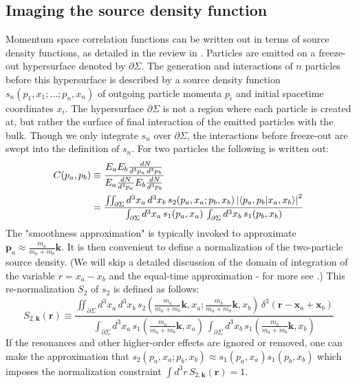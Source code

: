 \subsection{Imaging the source density function}
Momentum space correlation functions can be written out in terms of source density functions, as detailed in the review in \cite{Lisa:2005dd}.
Particles are emitted on a freeze-out hypersurface denoted by $\partial\Sigma$.
The generation and interactions of $n$ particles before this hypersurface is described by a source density function $s_n(p_1, x_1;\ldots; p_n, x_n)$ of outgoing particle momenta $p_i$ and initial spacetime coordinates $x_i$.
The hypersurface $\partial\Sigma$ is not a region where each particle is created at, but rather the surface of final interaction of the emitted particles with the bulk.
Though we only integrate $s_n$ over $\partial\Sigma$, the interactions before freeze-out are swept into the definition of $s_n$.
For two particles the following is written out:
\begin{align}
  C(p_a,p_b) &\equiv \frac{E_a E_b \frac{dN}{d^3 p_a \, d^3 p_b}}{E_a \frac{dN}{d^3 p_a} E_b \frac{dN}{d^3p_b}} 
  \\&= \frac{\iint_{\partial\Sigma} d^3 x_a \, d^3 x_b \, s_2 (p_a, x_a; p_b, x_b) \left| \braket{ p_a, p_b | x_a, x_b } \right|^2}{\int_{\partial\Sigma} d^3 x_a \, s_1 (p_a, x_a) \, \int_{\partial\Sigma} d^3 x_b \, s_1(p_b, x_b)}
\end{align}
 The "smoothness approximation" is typically invoked to approximate $\mathbf{p}_a \approx \frac{m_a}{m_a+m_b} \mathbf{k}$.
It is then convenient to define a normalization of the two-particle source density.
(We will skip a detailed discussion of the domain of integration of the variable $r = x_a - x_b$ and the equal-time approximation - for more see \cite{Lisa:2005dd}.) This re-normalization $S_2$ of $s_2$ is defined as follows:
\begin{equation} S_{2, \mathbf{k}} (\mathbf{r}) \equiv \frac{\iint_{\partial\Sigma} d^3 x_a \, d^3 x_b \, s_2 \left(\frac{m_a}{m_a+m_b}\mathbf{k}, x_a; \frac{m_b}{m_a+m_b}\mathbf{k}, x_b\right) \, \delta^3(\mathbf{r} - \mathbf{x}_a + \mathbf{x}_b)}{\int_{\partial\Sigma} d^3 x_a \, s_1 \left(\frac{m_a}{m_a+m_b}\mathbf{k}, x_a\right) \, \int_{\partial\Sigma} d^3 x_b \, s_1\left(\frac{m_b}{m_a+m_b}\mathbf{k}, x_b\right)}\end{equation}
If the resonances and other higher-order effects are ignored or removed, one can make the approximation that $s_2 (p_a, x_a; p_b, x_b) \approx s_1(p_a, x_a) s_1(p_b, x_b)$ which imposes the normalization constraint $\int d^3 r \, S_{2,\mathbf{k}}(\mathbf{r}) = 1$.

